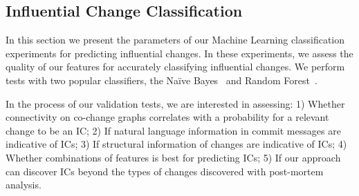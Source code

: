 



\subsection{Influential Change Classification}
\label{sec:classresults}

In this section we present the parameters of our Machine Learning classification
experiments for predicting influential changes. In these experiments, we assess
the quality of our features for accurately classifying influential
changes. We perform tests with two
popular classifiers, the Na\"{i}ve Bayes~\cite{lewis:ecml:1998,mlbook}
and Random Forest~\cite{breiman_random_2001}.



In the process of our validation tests, we are interested in assessing: 1)
Whether connectivity on co-change graphs correlates with a probability
for a relevant change to be an IC; 2) If natural language information in
commit messages are indicative of ICs; 3) If structural information of changes
are indicative of ICs; 4) Whether combinations of features is best for
predicting ICs; 5) If our approach can discover ICs beyond the types of
changes discovered with post-mortem analysis.


